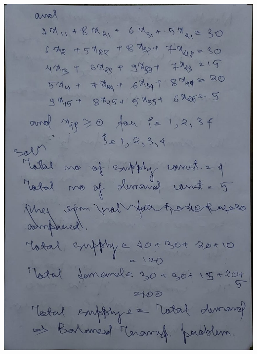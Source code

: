 \documentclass[12pt, letterpaper, twoside]{book}
\begin{document}
\includegraphics[width=\paperwidth, height=\paperheight]{Page4}
\end{document}

